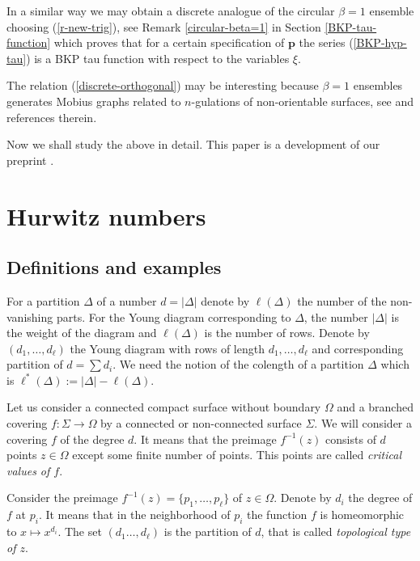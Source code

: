 \documentclass[a4paper,10pt]{article}
\newcommand{\bpow}{\mathbf{p}}
\theoremstyle{plain}
\theoremstyle{remark}
\begin{document}
In a similar way we may obtain a discrete analogue of the circular $\beta=1$ ensemble
choosing (\ref{r-new-trig}), see Remark \ref{circular-beta=1} in
Section \ref{BKP-tau-function} which proves that for a certain specification of $\bpow$ the series
(\ref{BKP-hyp-tau}) is a BKP tau function with respect to the variables $\xi$. 

The relation (\ref{discrete-orthogonal}) may be interesting  because
$\beta=1$ ensembles generates Mobius graphs related to $n$-gulations  of non-orientable surfaces, see \cite{Mulase}
and references therein.

Now we shall study the above in detail. This paper is a development of our preprint \cite{NO-2014}.




\section{Hurwitz numbers\label{definitions-section}}

\subsection{Definitions and examples}

For a partition $\Delta$ of a number $d=|\Delta|$ denote by $\ell(\Delta)$ the number of the non-vanishing parts.
For the Young diagram corresponding to $\Delta$, the number $|\Delta|$ is the weight  of the diagram  and $\ell(\Delta)$
is the number of rows. Denote by $(d_1,\dots,d_{\ell})$ the Young diagram with rows of length $d_1,\dots,d_{\ell}$ and
corresponding partition of $d=\sum d_i$. We need the notion of the colength of a partition $\Delta$ which is
$\ell^*(\Delta):=|\Delta|-\ell(\Delta)$.

Let us consider a connected compact surface without boundary $\Omega$ and a branched covering $f:\Sigma\rightarrow\Omega$
by a connected or non-connected surface $\Sigma$. We will consider a covering $f$ of the degree $d$. It means that the
preimage $f^{-1}(z)$ consists of $d$ points $z\in\Omega$ except some finite number of points. This points are called
\textit{critical values of $f$}.

Consider the preimage $f^{-1}(z)=\{p_1,\dots,p_{\ell}\}$ of $z\in\Omega$. Denote by $d_i$ the degree of $f$ at $p_i$. It
means that in the neighborhood of $p_i$ the function $f$ is homeomorphic to $x\mapsto x^{d_i}$. The set $(d_1\dots,d_{\ell})$
is the partition of $d$, that is called \textit{topological type of $z$}.
\end{document}
